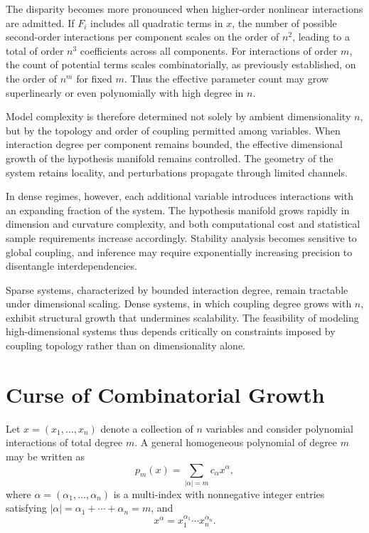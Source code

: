 \documentclass[12pt]{book}
\begin{document}
The disparity becomes more pronounced when higher-order nonlinear interactions are admitted. If $F_i$ includes all quadratic terms in $x$, the number of possible second-order interactions per component scales on the order of $n^2$, leading to a total of order $n^3$ coefficients across all components. For interactions of order $m$, the count of potential terms scales combinatorially, as previously established, on the order of $n^m$ for fixed $m$. Thus the effective parameter count may grow superlinearly or even polynomially with high degree in $n$.

Model complexity is therefore determined not solely by ambient dimensionality $n$, but by the topology and order of coupling permitted among variables. When interaction degree per component remains bounded, the effective dimensional growth of the hypothesis manifold remains controlled. The geometry of the system retains locality, and perturbations propagate through limited channels.

In dense regimes, however, each additional variable introduces interactions with an expanding fraction of the system. The hypothesis manifold grows rapidly in dimension and curvature complexity, and both computational cost and statistical sample requirements increase accordingly. Stability analysis becomes sensitive to global coupling, and inference may require exponentially increasing precision to disentangle interdependencies.

Sparse systems, characterized by bounded interaction degree, remain tractable under dimensional scaling. Dense systems, in which coupling degree grows with $n$, exhibit structural growth that undermines scalability. The feasibility of modeling high-dimensional systems thus depends critically on constraints imposed by coupling topology rather than on dimensionality alone.

\section{Curse of Combinatorial Growth}

Let $x = (x_1,\dots,x_n)$ denote a collection of $n$ variables and consider polynomial interactions of total degree $m$. A general homogeneous polynomial of degree $m$ may be written as
\[
p_m(x)
=
\sum_{|\alpha| = m} c_\alpha x^\alpha,
\]
where $\alpha = (\alpha_1,\dots,\alpha_n)$ is a multi-index with nonnegative integer entries satisfying $|\alpha| = \alpha_1 + \cdots + \alpha_n = m$, and
\[
x^\alpha = x_1^{\alpha_1}\cdots x_n^{\alpha_n}.
\]
\end{document}
